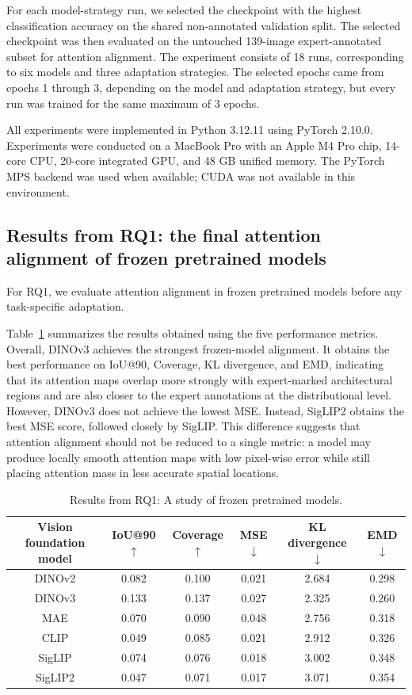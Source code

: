 \documentclass[lineno,pdflatex,sn-mathphys-num]{sn-jnl}%
\theoremstyle{thmstyleone}%
\theoremstyle{thmstyletwo}%
\theoremstyle{thmstylethree}%
\begin{document}
For each model-strategy run, we selected the checkpoint with the highest classification accuracy on the shared non-annotated validation split. The selected checkpoint was then evaluated on the untouched 139-image expert-annotated subset for attention alignment. The experiment consists of 18 runs, corresponding to six models and three adaptation strategies. The selected epochs came from epochs 1 through 3, depending on the model and adaptation strategy, but every run was trained for the same maximum of 3 epochs.

All experiments were implemented in Python 3.12.11 using PyTorch 2.10.0. Experiments were conducted on a MacBook Pro with an Apple M4 Pro chip, 14-core CPU, 20-core integrated GPU, and 48 GB unified memory. The PyTorch MPS backend was used when available; CUDA was not available in this environment.

\subsection{Results from RQ1: the final attention alignment of frozen pretrained models}

For RQ1, we evaluate attention alignment in frozen pretrained models before any task-specific adaptation.

Table~\ref{table RQ1 result} summarizes the results obtained using the five performance metrics. Overall, DINOv3 achieves the strongest frozen-model alignment. It obtains the best performance on IoU@90, Coverage, KL divergence, and EMD, indicating that its attention maps overlap more strongly with expert-marked architectural regions and are also closer to the expert annotations at the distributional level. However, DINOv3 does not achieve the lowest MSE. Instead, SigLIP2 obtains the best MSE score, followed closely by SigLIP. This difference suggests that attention alignment should not be reduced to a single metric: a model may produce locally smooth attention maps with low pixel-wise error while still placing attention mass in less accurate spatial locations.

\begin{table}[!h]
\centering
\caption{Results from RQ1: A study of frozen pretrained models.\label{table RQ1 result}}
\begin{tabular}{cccccc}
\toprule
Vision foundation model & IoU@90 $\uparrow$ & Coverage $\uparrow$ & MSE $\downarrow$ & KL divergence $\downarrow$ & EMD $\downarrow$ \\ \midrule
DINOv2    & 0.082 & 0.100 & 0.021 & 2.684 & 0.298 \\
DINOv3     & 0.133 & 0.137 & 0.027 & 2.325 & 0.260 \\
MAE        & 0.070 & 0.090 & 0.048 & 2.756 & 0.318 \\
CLIP      & 0.049 & 0.085 & 0.021 & 2.912 & 0.326 \\
SigLIP    & 0.074 & 0.076 & 0.018 & 3.002 & 0.348 \\
SigLIP2   & 0.047 & 0.071 & 0.017 & 3.071 & 0.354 \\ \bottomrule
\end{tabular}
\end{table}
\end{document}
